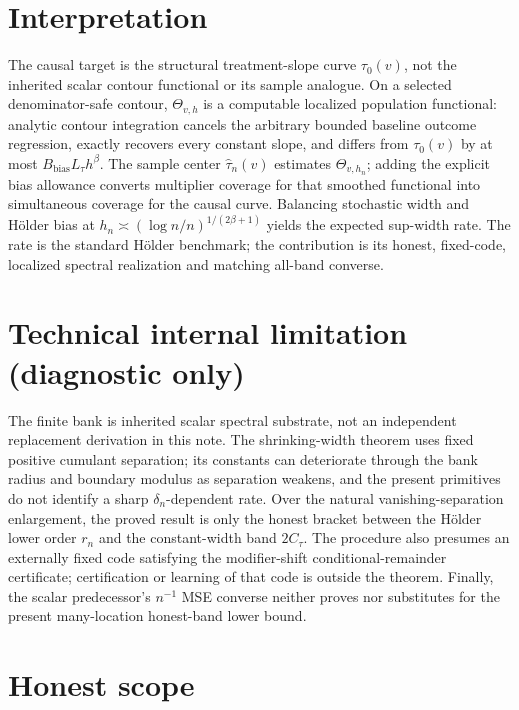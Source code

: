 \documentclass{article}
\begin{document}
\section{Interpretation}

The causal target is the structural treatment-slope curve \(\tau_0(v)\), not the inherited scalar contour functional or its sample analogue. On a selected denominator-safe contour, \(\Theta_{v,h}\) is a computable localized population functional: analytic contour integration cancels the arbitrary bounded baseline outcome regression, exactly recovers every constant slope, and differs from \(\tau_0(v)\) by at most \(B_{\mathrm{bias}}L_\tau h^\beta\). The sample center \(\widehat\tau_n(v)\) estimates \(\Theta_{v,h_n}\); adding the explicit bias allowance converts multiplier coverage for that smoothed functional into simultaneous coverage for the causal curve. Balancing stochastic width and Hölder bias at \(h_n\asymp(\log n/n)^{1/(2\beta+1)}\) yields the expected sup-width rate. The rate is the standard Hölder benchmark; the contribution is its honest, fixed-code, localized spectral realization and matching all-band converse.

\section*{Technical internal limitation (diagnostic only)}

The finite bank is inherited scalar spectral substrate, not an independent replacement derivation in this note. The shrinking-width theorem uses fixed positive cumulant separation; its constants can deteriorate through the bank radius and boundary modulus as separation weakens, and the present primitives do not identify a sharp \(\delta_n\)-dependent rate. Over the natural vanishing-separation enlargement, the proved result is only the honest bracket between the Hölder lower order \(r_n\) and the constant-width band \(2C_\tau\). The procedure also presumes an externally fixed code satisfying the modifier-shift conditional-remainder certificate; certification or learning of that code is outside the theorem. Finally, the scalar predecessor's \(n^{-1}\) MSE converse neither proves nor substitutes for the present many-location honest-band lower bound.

\section{Honest scope}
\end{document}
